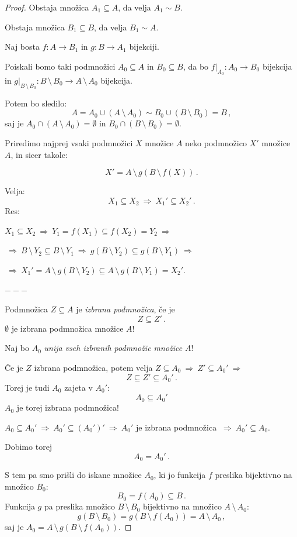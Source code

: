 \documentclass[11pt,paper=b5,footinclude,headinclude]{scrbook} %
\def\sledi {{~\Rightarrow~}}
\def\brez {{\,\setminus\,}}
\def\cee {{~\Leftrightarrow~}}
\begin{document}
\begin{proof}
Obstaja množica $A_1\subseteq A$, da velja $A_1\sim B$.

Obstaja množica $B_1\subseteq B$, da velja $B_1\sim A$.

Naj bosta $f:A\to B_1$ in $g:B\to A_1$ bijekciji.

Poiskali bomo taki podmnožici $A_0\subseteq A$ in $B_0\subseteq B$, da bo
$f|_{A_0}:A_0\to B_0$ bijekcija in $g|_{B\brez B_0}:B\brez B_0\to A\brez A_0$ bijekcija.

Potem bo sledilo:
$$A = A_0\cup (A\brez A_0)\sim B_0\cup (B\brez B_0)= B\,,$$
saj je $A_0\cap (A\brez A_0) = \emptyset$ in
 $B_0\cap (B\brez B_0) = \emptyset$.

 \medskip
Priredimo najprej vsaki podmnožici $X$ množice $A$ neko podmnožico $X'$
množice $A$, in sicer takole:

%
$$X' = A\brez g(B\brez f(X))\,.$$

%
\medskip
Velja:
$$X_1\subseteq X_2\sledi X_1'\subseteq X_2'\,.$$
Res:

$X_1\subseteq X_2
\sledi
Y_1 = f(X_1)\subseteq f(X_2) = Y_2\sledi$

$\sledi B\brez Y_2\subseteq B\brez Y_1\sledi g(B\brez Y_2)\subseteq g(B\brez Y_1)\sledi$

$\sledi X_1' = A\brez g(B\brez Y_2)\subseteq A\brez g(B\brez Y_1)= X_2'$.

$---$

Podmnožica $Z\subseteq A$ je {\em izbrana podmnožica}, če je
$$Z\subseteq Z'\,.$$
$\emptyset$ je izbrana podmnožica množice $A$!

Naj bo $A_0$ {\em unija vseh izbranih podmnožic množice} $A$!

Če je $Z$ izbrana podmnožica, potem velja $Z\subseteq A_0\sledi Z'\subseteq A_0'\sledi$
$$Z\subseteq Z'\subseteq A_0'\,.$$
Torej je tudi $A_0$ zajeta v $A_0'$:
$$A_0\subseteq A_0'$$
$A_0$ je torej izbrana podmnožica!

$A_0\subseteq A_0' \sledi A_0'\subseteq (A_0')'\sledi
A_0'$ je izbrana podmnožica $\sledi A_0'\subseteq A_0$.

Dobimo torej $$A_0 = A_0'\,.$$

S tem pa smo prišli do iskane množice $A_0$, ki jo funkcija $f$ preslika bijektivno na množico
$B_0$:
$$B_0 = f(A_0)\subseteq B\,.$$
Funkcija $g$ pa preslika množico $B\brez B_0$ bijektivno na množico $A\brez A_0$:
$$g(B\brez B_0) = g(B\brez f(A_0)) = A\brez A_0\,,$$
saj je $A_0 = A\brez g(B\brez f(A_0))$.
\end{proof}
\end{document}
